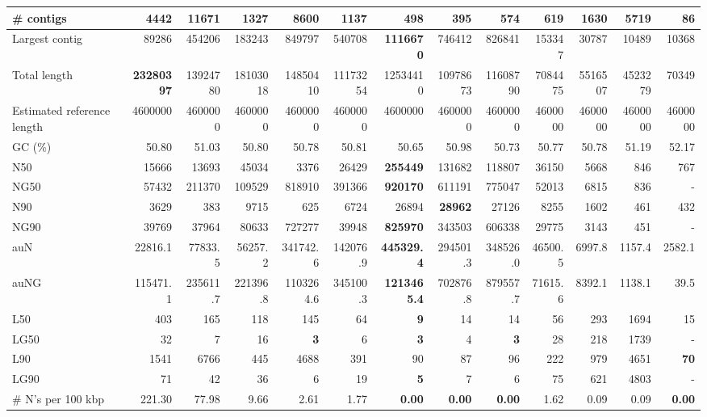 \documentclass[12pt,a4paper]{article}
\begin{document}
\begin{table}[ht]
\begin{center}
\begin{tabular}{|l*{12}{|r}|}
\# contigs & 4442 & 11671 & 1327 & 8600 & 1137 & 498 & 395 & 574 & 619 & 1630 & 5719 & 86 \\ \hline
Largest contig & 89286 & 454206 & 183243 & 849797 & 540708 & {\bf 1116670} & 746412 & 826841 & 153347 & 30787 & 10489 & 10368 \\ \hline
Total length & {\bf 23280397} & 13924780 & 18103018 & 14850410 & 11173254 & 12534410 & 10978673 & 11608790 & 7084475 & 5516507 & 4523279 & 70349 \\ \hline
Estimated reference length & 4600000 & 4600000 & 4600000 & 4600000 & 4600000 & 4600000 & 4600000 & 4600000 & 4600000 & 4600000 & 4600000 & 4600000 \\ \hline
GC (\%) & 50.80 & 51.03 & 50.80 & 50.78 & 50.81 & 50.65 & 50.98 & 50.73 & 50.77 & 50.78 & 51.19 & 52.17 \\ \hline
N50 & 15666 & 13693 & 45034 & 3376 & 26429 & {\bf 255449} & 131682 & 118807 & 36150 & 5668 & 846 & 767 \\ \hline
NG50 & 57432 & 211370 & 109529 & 818910 & 391366 & {\bf 920170} & 611191 & 775047 & 52013 & 6815 & 836 & - \\ \hline
N90 & 3629 & 383 & 9715 & 625 & 6724 & 26894 & {\bf 28962} & 27126 & 8255 & 1602 & 461 & 432 \\ \hline
NG90 & 39769 & 37964 & 80633 & 727277 & 39948 & {\bf 825970} & 343503 & 606338 & 29775 & 3143 & 451 & - \\ \hline
auN & 22816.1 & 77833.5 & 56257.2 & 341742.6 & 142076.9 & {\bf 445329.4} & 294501.3 & 348526.0 & 46500.5 & 6997.8 & 1157.4 & 2582.1 \\ \hline
auNG & 115471.1 & 235611.7 & 221396.8 & 1103264.6 & 345100.3 & {\bf 1213465.4} & 702876.8 & 879557.7 & 71615.6 & 8392.1 & 1138.1 & 39.5 \\ \hline
L50 & 403 & 165 & 118 & 145 & 64 & {\bf 9} & 14 & 14 & 56 & 293 & 1694 & 15 \\ \hline
LG50 & 32 & 7 & 16 & {\bf 3} & 6 & {\bf 3} & 4 & {\bf 3} & 28 & 218 & 1739 & - \\ \hline
L90 & 1541 & 6766 & 445 & 4688 & 391 & 90 & 87 & 96 & 222 & 979 & 4651 & {\bf 70} \\ \hline
LG90 & 71 & 42 & 36 & 6 & 19 & {\bf 5} & 7 & 6 & 75 & 621 & 4803 & - \\ \hline
\# N's per 100 kbp & 221.30 & 77.98 & 9.66 & 2.61 & 1.77 & {\bf 0.00} & {\bf 0.00} & {\bf 0.00} & 1.62 & 0.09 & 0.09 & {\bf 0.00} \\ \hline
\end{tabular}
\end{center}
\end{table}
\end{document}
